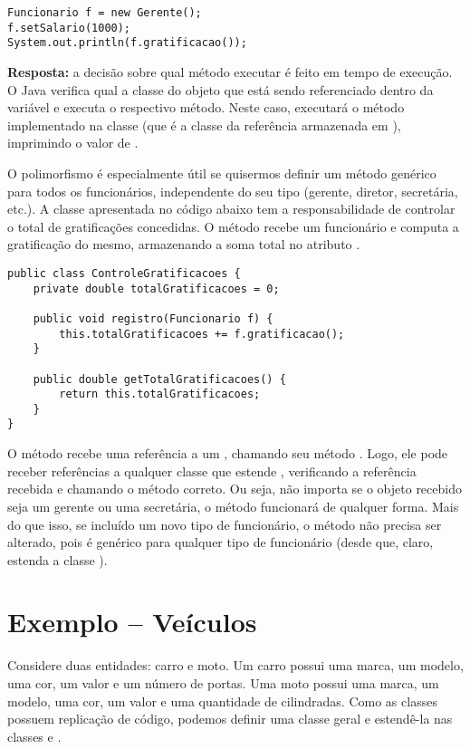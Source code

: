 \begin{verbatim}
Funcionario f = new Gerente();
f.setSalario(1000);
System.out.println(f.gratificacao());
\end{verbatim}

\textbf{Resposta: } a decisão sobre qual método executar é feito em tempo de execução. O Java verifica qual a classe do objeto que está sendo referenciado dentro da variável e executa o respectivo método. Neste caso, executará o método implementado na classe  (que é a classe da referência armazenada em ), imprimindo o valor de .

O polimorfismo é especialmente útil se quisermos definir um método genérico para todos os funcionários, independente do seu tipo (gerente, diretor, secretária, etc.). A classe apresentada no código abaixo tem a responsabilidade de controlar o total de gratificações concedidas. O método  recebe um funcionário e computa a gratificação do mesmo, armazenando a soma total no atributo .

\begin{verbatim}
public class ControleGratificacoes {
	private double totalGratificacoes = 0;

	public void registro(Funcionario f) {
		this.totalGratificacoes += f.gratificacao();
	}

	public double getTotalGratificacoes() {
		return this.totalGratificacoes;
	}
}
\end{verbatim}

O método  recebe uma referência a um , chamando seu método . Logo, ele pode receber referências a qualquer classe que estende , verificando a referência recebida e chamando o método correto. Ou seja, não importa se o objeto recebido seja um gerente ou uma secretária, o método funcionará de qualquer forma. Mais do que isso, se incluído um novo tipo de funcionário, o método  não precisa ser alterado, pois é genérico para qualquer tipo de funcionário (desde que, claro, estenda a classe ).

\section{Exemplo -- Veículos}
Considere duas entidades: carro e moto. Um carro possui uma marca, um modelo, uma cor, um valor e um número de portas. Uma moto possui uma marca, um modelo, uma cor, um valor e uma quantidade de cilindradas. Como as classes possuem replicação de código, podemos definir uma classe geral e estendê-la nas classes  e .

